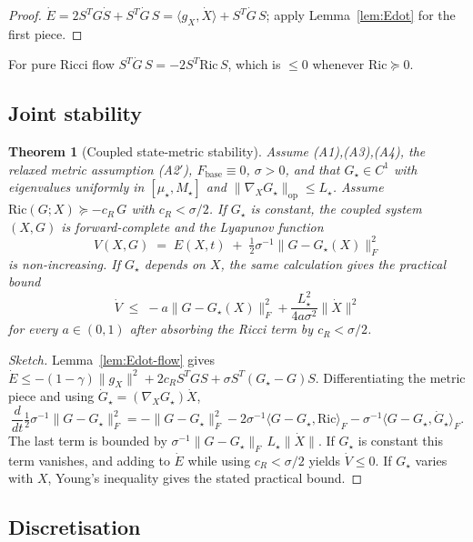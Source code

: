 \documentclass[11pt,oneside]{amsart}
\theoremstyle{plain}
\newtheorem{theorem}{Theorem}[section]
\theoremstyle{definition}
\newcommand{\Xdot}{\dot{X}}
\newcommand{\gX}{g_X}
\newcommand{\Fbase}{F_{\mathrm{base}}}
\begin{document}
\begin{proof}
$\dot E = 2 S^{T}G\dot S + S^{T}\dot G\,S = \langle\gX,\Xdot\rangle + S^{T}\dot G\,S$;
apply Lemma~\ref{lem:Edot} for the first piece.
\end{proof}

For pure Ricci flow $S^{T}\dot G\,S = -2 S^{T}\mathrm{Ric}\,S$, which
is $\le 0$ whenever $\mathrm{Ric}\succeq 0$.

\subsection{Joint stability}

\begin{theorem}[Coupled state-metric stability]
\label{thm:joint-stable}
Assume \textup{(A1),(A3),(A4)}, the relaxed metric assumption
\textup{(A2$'$)}, $\Fbase\equiv 0$, $\sigma>0$, and that
$G_{\star}\in C^{1}$ with eigenvalues uniformly in
$[\mu_{\star},M_{\star}]$ and $\|\nabla_{X}G_{\star}\|_{\mathrm{op}}\le L_{\star}$.
Assume $\mathrm{Ric}(G;X)\succeq -c_{R}\,G$ with $c_{R}<\sigma/2$.
If $G_{\star}$ is constant, the coupled system $(X,G)$ is
forward-complete and the Lyapunov function
\[
  V(X,G) \;=\; E(X,t) \;+\; \tfrac{1}{2}\sigma^{-1}\|G-G_{\star}(X)\|_{F}^{2}
\]
is non-increasing. If $G_{\star}$ depends on $X$, the same calculation
gives the practical bound
\[
  \dot V \;\le\; -a\|G-G_{\star}(X)\|_{F}^{2}
          + \frac{L_{\star}^{2}}{4a\sigma^{2}}\|\Xdot\|^{2}
\]
for every $a\in(0,1)$ after absorbing the Ricci term by
$c_{R}<\sigma/2$.
\end{theorem}

\begin{proof}[Sketch]
Lemma~\ref{lem:Edot-flow} gives
$\dot E\le -(1-\gamma)\|\gX\|^{2} + 2c_{R} S^{T}G S + \sigma S^{T}(G_{\star}-G)S$.
Differentiating the metric piece and using $\dot G_{\star} = (\nabla_{X}G_{\star})\Xdot$,
\[
  \frac{d}{dt}\tfrac{1}{2}\sigma^{-1}\|G-G_{\star}\|_{F}^{2}
  = -\|G-G_{\star}\|_{F}^{2}
    -2\sigma^{-1}\langle G-G_{\star},\mathrm{Ric}\rangle_{F}
    -\sigma^{-1}\langle G-G_{\star},\dot G_{\star}\rangle_{F}.
\]
The last term is bounded by
$\sigma^{-1}\|G-G_{\star}\|_{F}\,L_{\star}\|\Xdot\|$. If $G_{\star}$ is
constant this term vanishes, and adding to $\dot E$ while using
$c_{R}<\sigma/2$ yields $\dot V\le 0$. If $G_{\star}$ varies with $X$,
Young's inequality gives the stated practical bound.
\end{proof}

\subsection{Discretisation}
\end{document}
